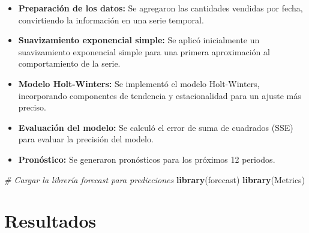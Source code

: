 \documentclass[
]{book}
\newenvironment{Shaded}{\begin{snugshade}}{\end{snugshade}}
\newcommand{\AttributeTok}[1]{\textcolor[rgb]{0.13,0.29,0.53}{#1}}
\newcommand{\CommentTok}[1]{\textcolor[rgb]{0.56,0.35,0.01}{\textit{#1}}}
\newcommand{\FunctionTok}[1]{\textcolor[rgb]{0.13,0.29,0.53}{\textbf{#1}}}
\newcommand{\NormalTok}[1]{#1}
\newcommand{\OtherTok}[1]{\textcolor[rgb]{0.56,0.35,0.01}{#1}}
\newcommand{\SpecialCharTok}[1]{\textcolor[rgb]{0.81,0.36,0.00}{\textbf{#1}}}
\newcommand{\StringTok}[1]{\textcolor[rgb]{0.31,0.60,0.02}{#1}}
\begin{document}
\begin{itemize}
\item
  \textbf{Preparación de los datos:} Se agregaron las cantidades vendidas por fecha, convirtiendo la información en una serie temporal.
\item
  \textbf{Suavizamiento exponencial simple:} Se aplicó inicialmente un suavizamiento exponencial simple para una primera aproximación al comportamiento de la serie.
\item
  \textbf{Modelo Holt-Winters:} Se implementó el modelo Holt-Winters, incorporando componentes de tendencia y estacionalidad para un ajuste más preciso.
\item
  \textbf{Evaluación del modelo:} Se calculó el error de suma de cuadrados (SSE) para evaluar la precisión del modelo.
\item
  \textbf{Pronóstico:} Se generaron pronósticos para los próximos 12 periodos.
\end{itemize}

\begin{Shaded}
\begin{Highlighting}[]
\CommentTok{\# Cargar la librería forecast para predicciones}
\FunctionTok{library}\NormalTok{(forecast)}
\FunctionTok{library}\NormalTok{(Metrics)}
\end{Highlighting}
\end{Shaded}

\begin{Shaded}
\end{Shaded}

\section{\texorpdfstring{\textbf{Resultados}}{Resultados}}\label{resultados}
\end{document}
